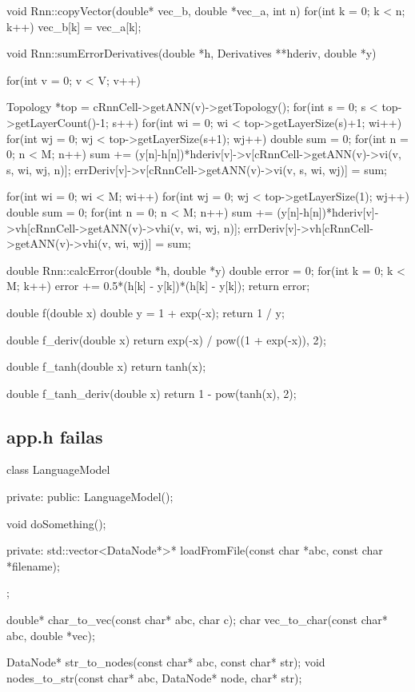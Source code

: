 void Rnn::copyVector(double* vec\_b, double *vec\_a, int n){
  for(int k = 0; k < n; k++)
    vec\_b[k] = vec\_a[k];
}

void Rnn::sumErrorDerivatives(double *h, Derivatives **hderiv, double *y){
  for(int v = 0; v < V; v++){
    Topology *top = cRnnCell->getANN(v)->getTopology();
    for(int s = 0; s < top->getLayerCount()-1; s++){
      for(int wi = 0; wi < top->getLayerSize(s)+1; wi++){
        for(int wj = 0; wj < top->getLayerSize(s+1); wj++){
          double sum = 0;
          for(int n = 0; n < M; n++)
            sum += (y[n]-h[n])*hderiv[v]->v[cRnnCell->getANN(v)->vi(v, s, wi, wj, n)];
          errDeriv[v]->v[cRnnCell->getANN(v)->vi(v, s, wi, wj)] = sum;
        }
      }
    }


    for(int wi = 0; wi < M; wi++){
      for(int wj = 0; wj < top->getLayerSize(1); wj++){
        double sum = 0;
        for(int n = 0; n < M; n++)
          sum += (y[n]-h[n])*hderiv[v]->vh[cRnnCell->getANN(v)->vhi(v, wi, wj, n)];
        errDeriv[v]->vh[cRnnCell->getANN(v)->vhi(v, wi, wj)] = sum;
      }
    }
  }
}

double Rnn::calcError(double *h, double *y){
  double error = 0;
  for(int k = 0; k < M; k++)
    error += 0.5*(h[k] - y[k])*(h[k] - y[k]);
  return error;
}

double f(double x){
  double y = 1 + exp(-x);
  return 1 / y;
}

double f\_deriv(double x){
  return exp(-x) / pow((1 + exp(-x)), 2);
}

double f\_tanh(double x){
  return tanh(x);
}

double f\_tanh\_deriv(double x){
  return 1 - pow(tanh(x), 2);
}


\subsection{app.h failas}


class LanguageModel {
  private:
  public:
    LanguageModel();

    void doSomething();

  private:
    std::vector<DataNode*>* loadFromFile(const char *abc, const char *filename);

};

double* char\_to\_vec(const char* abc, char c);
char vec\_to\_char(const char* abc, double  *vec);

DataNode* str\_to\_nodes(const char* abc, const char* str);
void nodes\_to\_str(const char* abc, DataNode* node, char* str);



